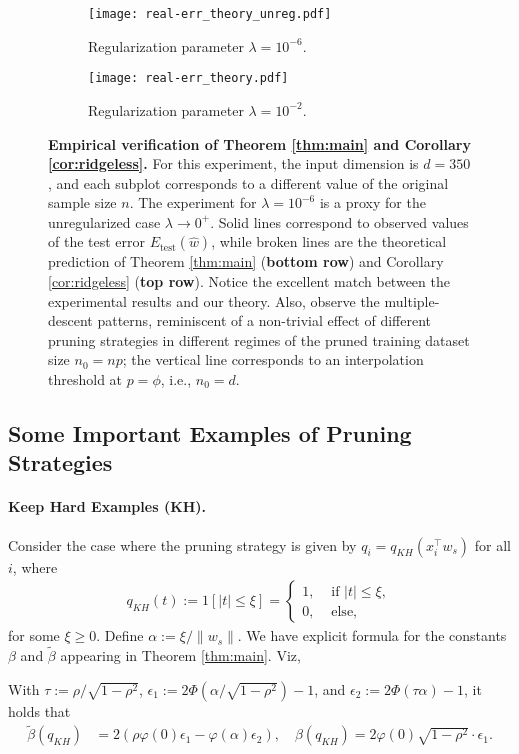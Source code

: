\begin{figure}[!h]
    \centering
    \begin{subfigure}{0.6\linewidth}
        \centering
        \texttt{[image: real-err\_theory\_unreg.pdf]}
        \caption{Regularization parameter $\lambda=10^{-6}$.}
        \label{fig:subfig1}
    \end{subfigure}
    \hfill
    \begin{subfigure}{0.6\linewidth}
        \centering
        \texttt{[image: real-err\_theory.pdf]}
        \caption{Regularization parameter $\lambda=10^{-2}$.}
        \label{fig:subfig2}
    \end{subfigure}

    \caption{\textbf{Empirical verification of Theorem \ref{thm:main} and Corollary \ref{cor:ridgeless}.} For this experiment, the input dimension is $d=350$, and each subplot corresponds to a different value of the original sample size $n$. The experiment for $\lambda=10^{-6}$ is a proxy for the unregularized case $\lambda\to 0^+$. Solid lines correspond to observed values of the test error $E_{\text{test}}(\hat{w})$, while broken lines are the theoretical prediction of Theorem \ref{thm:main} (\textbf{bottom row}) and Corollary \ref{cor:ridgeless} (\textbf{top row}). Notice the excellent match between the experimental results and our theory. Also, observe the multiple-descent patterns, reminiscent of a non-trivial effect of different pruning strategies in different regimes of the pruned training dataset size $n_0=np$; the vertical line corresponds to an interpolation threshold at $p=\phi$, i.e., $n_0=d$.}
    \label{fig:figcool}
\end{figure}

\subsection{Some Important Examples of Pruning Strategies}
\paragraph{Keep Hard Examples (KH).} Consider the case where the pruning strategy is given by $q_i = q_{KH}(x_i^\top w_s)$ for all $i$, where
\begin{eqnarray}
q_{KH}(t) := 1[|t| \le \xi] =  \begin{cases}
    1,&\mbox{ if }|t| \le \xi,\\
    0,&\mbox{ else,}
    \end{cases}
\end{eqnarray}
for some $\xi \ge 0$. Define $\alpha:=\xi/\|w_s\|$. We have explicit formula for the constants $\beta$ and $\tilde \beta$ appearing in Theorem \ref{thm:main}. Viz,
\begin{lemma}
With $\tau:=\rho/\sqrt{1-\rho^2}$, $\epsilon_1 := 2\Phi(\alpha/\sqrt{1-\rho^2})-1$, and $\epsilon_2 := 2\Phi(\tau \alpha)-1$, it holds that
\begin{align}
    \tilde \beta(q_{KH}) &= 2(\rho\varphi(0)\epsilon_1-\varphi(\alpha)\epsilon_2),\quad
    \beta(q_{KH}) = 2\varphi(0)\sqrt{1-\rho^2}\cdot \epsilon_1.
\end{align}
\label{lm:KH}
\end{lemma}

